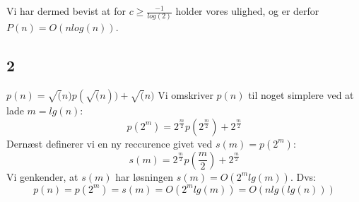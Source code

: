 Vi har dermed bevist at for $c \geq \frac{-1}{log(2)}$ holder vores ulighed, og er derfor $P(n) = O(nlog(n))$.

\subsection{2}

$p(n) = \sqrt(n)p(\sqrt(n)) + \sqrt(n)$
Vi omskriver $p(n)$ til noget simplere ved at lade $m = lg(n)$:
$$p(2^m) = 2^{\frac{m}{2}}p(2^{\frac{m}{2}}) + 2^{\frac{m}{2}}$$
Dernæst definerer vi en ny reccurence givet ved $s(m) = p(2^m)$:
$$s(m) = 2^{\frac{m}{2}}p(\frac{m}{2}) + 2^{\frac{m}{2}}$$
Vi genkender, at $s(m)$ har løsningen $s(m) = O(2^mlg(m))$.
Dvs:
$$p(n) = p(2^m) = s(m) = O(2^mlg(m)) = O(nlg(lg(n)))$$
